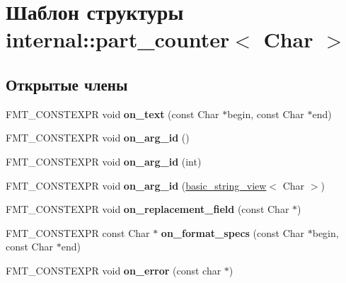 \hypertarget{structinternal_1_1part__counter}{}\section{Шаблон структуры internal\+:\+:part\+\_\+counter$<$ Char $>$}
\label{structinternal_1_1part__counter}
\subsection*{Открытые члены}
\begin{DoxyCompactItemize}
\item 
\mbox{\label{structinternal_1_1part__counter_a1275b8d80c0760d6ab1f4b4f8dacd684}} 
F\+M\+T\+\_\+\+C\+O\+N\+S\+T\+E\+X\+PR void {\bfseries on\+\_\+text} (const Char $\ast$begin, const Char $\ast$end)
\item 
\mbox{\label{structinternal_1_1part__counter_a0bf90b913dd7240d596595f0cc3d9971}} 
F\+M\+T\+\_\+\+C\+O\+N\+S\+T\+E\+X\+PR void {\bfseries on\+\_\+arg\+\_\+id} ()
\item 
\mbox{\label{structinternal_1_1part__counter_a5ccf7343f1bff3a3775cfdca7484ef14}} 
F\+M\+T\+\_\+\+C\+O\+N\+S\+T\+E\+X\+PR void {\bfseries on\+\_\+arg\+\_\+id} (int)
\item 
\mbox{\label{structinternal_1_1part__counter_a332f71c77fe71ea9fe94012e13ecfe78}} 
F\+M\+T\+\_\+\+C\+O\+N\+S\+T\+E\+X\+PR void {\bfseries on\+\_\+arg\+\_\+id} (\hyperlink{classbasic__string__view}{basic\+\_\+string\+\_\+view}$<$ Char $>$)
\item 
\mbox{\label{structinternal_1_1part__counter_a99ede3ae6f97726adda880fffb78eac9}} 
F\+M\+T\+\_\+\+C\+O\+N\+S\+T\+E\+X\+PR void {\bfseries on\+\_\+replacement\+\_\+field} (const Char $\ast$)
\item 
\mbox{\label{structinternal_1_1part__counter_a51c08a7e01f4dddfcf6784f4d149de83}} 
F\+M\+T\+\_\+\+C\+O\+N\+S\+T\+E\+X\+PR const Char $\ast$ {\bfseries on\+\_\+format\+\_\+specs} (const Char $\ast$begin, const Char $\ast$end)
\item 
\mbox{\label{structinternal_1_1part__counter_a3d7fc11c481b90d6003859b28a4e6359}} 
F\+M\+T\+\_\+\+C\+O\+N\+S\+T\+E\+X\+PR void {\bfseries on\+\_\+error} (const char $\ast$)
\end{DoxyCompactItemize}
